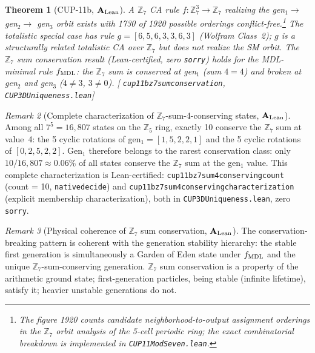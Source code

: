 \documentclass[11pt]{article}
\newtheorem{theorem}{Theorem}[section]
\theoremstyle{remark}
\newtheorem{remark}[theorem]{Remark}
\newcommand{\ZS}{\mathbb{Z}_7}
\newcommand{\lean}[1]{%
  \penalty-100
  \begingroup\def\_{\textunderscore\allowbreak}\texttt{#1}\endgroup}
\newcommand{\CatAL}{\ensuremath{\textbf{A}_{\rm Lean}}}
\begin{document}
\begin{theorem}[CUP-11b, $\CatAL$]
\label{thm:cup11b}
A $\mathbb{Z}_7$ CA rule $f: \ZS^3 \to \ZS$ realizing the gen$_1 \to$ gen$_2 \to$ gen$_3$
orbit exists with 1730 of 1920 possible orderings conflict-free.\footnote{The figure 1920
counts candidate neighborhood-to-output assignment orderings in the $\mathbb{Z}_7$ orbit
analysis of the 5-cell periodic ring; the exact combinatorial breakdown is implemented in
\lean{CUP11ModSeven.lean}.}
The totalistic special case has rule $g = [6,5,6,3,3,6,3]$ (Wolfram Class~2); $g$ is a structurally related totalistic CA over $\mathbb{Z}_7$ but does not realize the SM orbit.
The $\mathbb{Z}_7$ sum conservation result (Lean-certified, zero \texttt{sorry}) holds for the MDL-minimal rule $f_{\rm MDL}$: the $\mathbb{Z}_7$ sum is conserved at gen$_1$ (sum $4 = 4$) and broken at gen$_2$ and gen$_3$ ($4 \neq 3$, $3 \neq 0$).
[\lean{cup11b\_z7\_sum\_conservation}, \lean{CUP3DUniqueness.lean}]
\end{theorem}

\begin{remark}[Complete characterization of $\mathbb{Z}_7$-sum-4-conserving states, $\CatAL$]
Among all $7^5 = 16{,}807$ states on the $\mathbb{Z}_5$ ring, exactly 10 conserve the
$\mathbb{Z}_7$ sum at value~4: the 5 cyclic rotations of gen$_1 = [1,5,2,2,1]$ and
the 5 cyclic rotations of $[0,2,5,2,2]$.
Gen$_1$ therefore belongs to the rarest conservation class: only $10/16{,}807 \approx 0.06\%$ of
all states conserve the $\mathbb{Z}_7$ sum at the gen$_1$ value.
This complete characterization is Lean-certified:
\lean{cup11b\_z7\_sum4\_conserving\_count} (count = 10, \lean{native\_decide}) and
\lean{cup11b\_z7\_sum4\_conserving\_characterization} (explicit membership characterization),
both in \lean{CUP3DUniqueness.lean}, zero \texttt{sorry}.
\end{remark}

\begin{remark}[Physical coherence of $\mathbb{Z}_7$ sum conservation, $\CatAL$]
\label{rem:z7_conservation_coherence}
The conservation-breaking pattern is coherent with the generation stability hierarchy:
the stable first generation is simultaneously a Garden of Eden state under $f_{\rm MDL}$
and the unique $\mathbb{Z}_7$-sum-conserving generation.
$\mathbb{Z}_7$ sum conservation is a property of the arithmetic ground state;
first-generation particles, being stable (infinite lifetime), satisfy it;
heavier unstable generations do not.
\end{remark}
\end{document}
